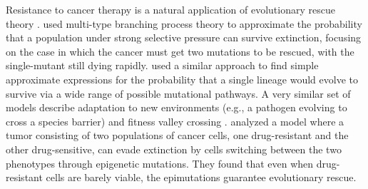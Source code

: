 \documentclass[12pt]{extarticle}
\begin{document}
Resistance to cancer therapy is a natural application of evolutionary rescue theory \citep{alexander2014evolutionary}. 
\citet{iwasa2003evolutionary} used multi-type branching process theory to approximate the probability that a population under strong selective pressure can survive extinction, focusing on the case in which the cancer must get two mutations to be rescued, with the single-mutant still dying rapidly.
\citet{iwasa2004evolutionary} used a similar approach to find simple approximate expressions for the probability that a single lineage would evolve to survive via a wide range of possible mutational pathways.
A very similar set of models describe adaptation to new environments (e.g., a pathogen evolving to cross a species barrier) and fitness valley crossing \citep{antia2003role, weissman2009rate}.
\citet{gunnarsson2020understanding} analyzed a model where a tumor consisting of two populations of cancer cells, one drug-resistant and the other drug-sensitive, can evade extinction by cells switching between the two phenotypes through epigenetic mutations. They found that even when drug-resistant cells are barely viable, the epimutations guarantee evolutionary rescue. 

\end{document}
